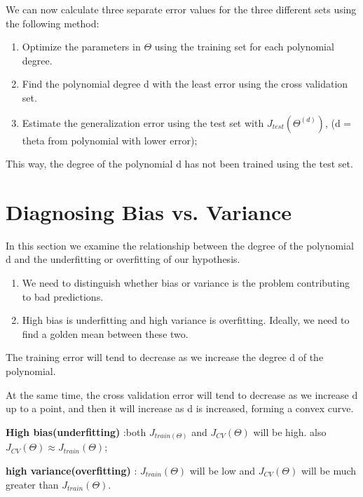\documentclass[10pt,a4paper,UTF8]{article}
\begin{document}
We can now calculate three separate error values for the three different sets using the following method:

\begin{enumerate}
\item Optimize the parameters in \(\Theta\) using the training set for each polynomial degree.
\item Find the polynomial degree d with the least error using the cross validation set.
\item Estimate the generalization error using the test set with \(J_{test}(\Theta^{(d)})\), (d = theta from polynomial with lower error);
\end{enumerate}

This way, the degree of the polynomial d has not been trained using the test set.
\section{Diagnosing Bias vs. Variance}
\label{sec:orgb100b81}


In this section we examine the relationship between the degree of the polynomial d and the underfitting or overfitting of our hypothesis.

\begin{enumerate}
\item We need to distinguish whether bias or variance is the problem contributing to bad predictions.
\item High bias is underfitting and high variance is overfitting. Ideally, we need to find a golden mean between these two.
\end{enumerate}

The training error will tend to decrease as we increase the degree d of the polynomial.

At the same time, the cross validation error will tend to decrease as we increase d up to a point, and then it will increase as d is increased, forming a convex curve.

\textbf{High bias(underfitting)} :both \(J_{train(\Theta)}\) and \(J_{CV}(\Theta)\) will be high. also \(J_{CV}(\Theta)\approx J_{train}(\Theta)\);

\textbf{high variance(overfitting)} : \(J_{train}(\Theta)\) will be low and \(J_{CV}(\Theta)\) will be much greater than \(J_{train}(\Theta)\).
\end{document}
